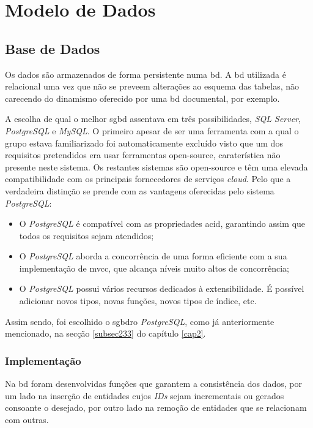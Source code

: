 \section{Modelo de Dados}\label{sec31}

%
%
\subsection{Base de Dados}\label{subsec311}

Os dados são armazenados de forma persistente numa \acrfull{bd}. A \acrshort{bd} utilizada é relacional uma vez que não se preveem alterações ao esquema das tabelas, não carecendo do dinamismo oferecido por uma \acrshort{bd} documental, por exemplo. 

A escolha de qual o melhor \acrfull{sgbd} assentava em três possibilidades, \textit{SQL Server}, \textit{PostgreSQL} e \textit{MySQL}. O primeiro apesar de ser uma ferramenta com a qual o grupo estava familiarizado foi automaticamente excluído visto que um dos requisitos pretendidos era usar ferramentas \gls{open-source}, caraterística não presente neste sistema. Os restantes sistemas são \gls{open-source} e têm uma elevada compatibilidade com os principais fornecedores de serviços \textit{cloud}. Pelo que a verdadeira distinção se prende com as vantagens oferecidas pelo sistema \textit{PostgreSQL}:
\begin{itemize}
	\item O \textit{PostgreSQL} é compatível com as propriedades \acrfull{acid}, garantindo assim que todos os requisitos sejam atendidos;
	\item O \textit{PostgreSQL} aborda a concorrência de uma forma eficiente com a sua implementação de \acrfull{mvcc}, que alcança níveis muito altos de concorrência;
	\item O \textit{PostgreSQL} possui vários recursos dedicados à extensibilidade. É possível adicionar novos tipos, novas funções, novos tipos de índice, etc.
\end{itemize}
Assim sendo, foi escolhido o \acrfull{sgbdro} \textit{PostgreSQL}, como já anteriormente mencionado, na secção \ref{subsec233} do capítulo \ref{cap2}.

\subsubsection{Implementação}\label{subsubsec3111}

Na \acrshort{bd} foram desenvolvidas funções que garantem a consistência dos dados, por um lado na inserção de entidades cujos \textit{IDs} sejam incrementais ou gerados consoante o desejado, por outro lado na remoção  de entidades que se relacionam com outras.

